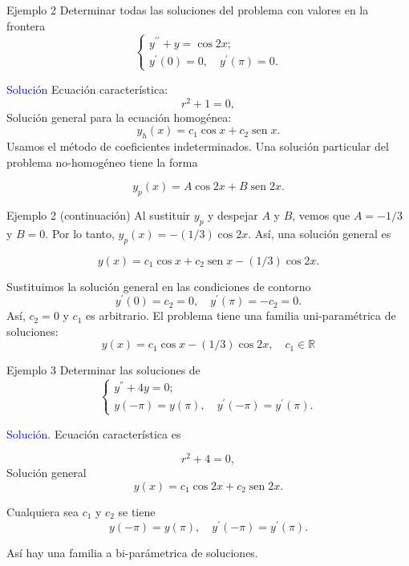 \documentclass[xcolor=dvipsnames,a4paper,10pt,handout]{beamer}
\newcommand{\rr}{\mathbb{R}}
\renewcommand{\emph}[1]{\textcolor{blue}{#1}}
\DeclareMathOperator{\sen}{sen}
\begin{document}
\begin{frame}{Ejemplo 2}
\onslide<+->
  Determinar todas las soluciones del problema con valores en la frontera
\[
 \left\{
        \begin{array}{l}
                     y^{\prime \prime}+y=\cos 2 x;\\
                     y^{\prime}(0)=0, \quad y^{\prime}(\pi)=0.
        \end{array}
 \right.
\]    

\onslide<+->
\emph{Solución} Ecuación característica: 
                    $$r^{2}+1=0,$$ 
Solución general para la ecuación homogénea:
$$y_{h}(x)=c_{1} \cos x+c_{2} \sen x.$$
Usamos el método de coeficientes indeterminados. Una solución particular del problema no-homogéneo  tiene la forma 

$$y_{p}(x)=A\cos 2 x+B \sen 2 x.$$ 

\end{frame}


\begin{frame}{Ejemplo 2 (continuación)}
Al sustituir $y_{p}$  y despejar $A$ y $B$, vemos que $A=-1 / 3$ y $B=0$. Por lo tanto, $y_{p}(x)=-(1 / 3) \cos 2 x$. Así, una solución general  es

$$y(x)=c_{1} \cos x+c_{2} \sen x-(1 / 3) \cos 2 x.$$

Sustituimos la solución general en las condiciones de contorno
$$
y^{\prime}(0)=c_{2}=0, \quad y^{\prime}(\pi)=-c_{2}=0 .
$$
Así, $c_{2}=0$ y $c_{1}$ es arbitrario. El problema  tiene una familia uni-paramétrica de soluciones:
$$
y(x)=c_{1} \cos x-(1 / 3) \cos 2 x,\quad c_1\in\rr
$$

\end{frame}


\begin{frame}{Ejemplo 3}
\onslide<+->
Determinar las soluciones de
\[
 \left\{
        \begin{array}{l}
                     y^{''}+4 y=0;\\
                     y(-\pi)=y(\pi), \quad y^{\prime}(-\pi)=y^{\prime}(\pi).
        \end{array}
 \right.
\]    

\onslide<+->
\emph{Solución.} Ecuación característica es 

$$r^{2}+4=0,$$ 
Solución general
$$y(x)=c_{1} \cos 2 x+c_{2} \operatorname{sen} 2 x.$$

Cualquiera sea $c_1$ y $c_2$ se tiene  
$$y(-\pi)=y(\pi),\quad  y^{\prime}(-\pi)=y^{\prime}(\pi).$$ 

Así  hay una familia a bi-parámetrica de soluciones.

\end{frame}
\end{document}

